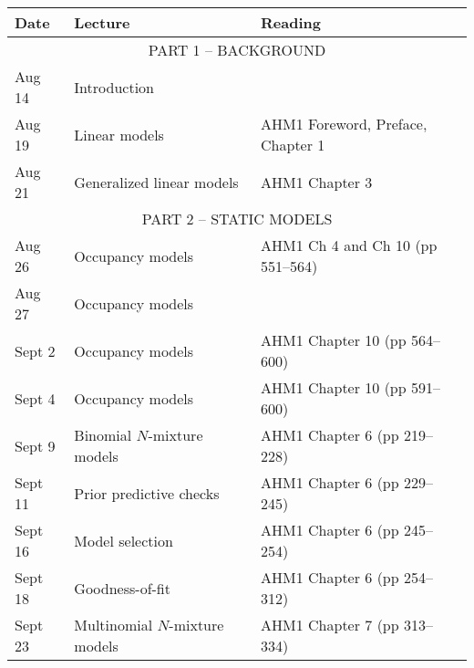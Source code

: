 \documentclass[12pt]{article}
\begin{document}
\begin{center}
\begin{tabular}[c]{lll}
\hline \hline
{\bf Date} & {\bf Lecture}                                & {\bf Reading}                                         \\
\hline
           \multicolumn{3}{c}{PART 1 -- BACKGROUND}                                                               \\
\hline
Aug 14     & Introduction                                 &                                                       \\
\hline
Aug 19     & Linear models                                & AHM1 Foreword, Preface, Chapter 1                     \\
Aug 21     & Generalized linear models                    & AHM1 Chapter 3                                        \\
\hline
           \multicolumn{3}{c}{PART 2 -- STATIC MODELS}                                                            \\
\hline
Aug 26     & Occupancy models                             & AHM1 Ch 4 and Ch 10 (pp 551--564)                     \\
Aug 27     & Occupancy models                             &                                                       \\
\hline
Sept 2     & Occupancy models                             & AHM1 Chapter 10 (pp 564--600)                         \\
Sept 4     & Occupancy models                             & AHM1 Chapter 10 (pp 591--600)                         \\
\hline
Sept 9    & Binomial $N$-mixture models                  & AHM1 Chapter 6 (pp 219--228)                          \\
Sept 11    & Prior predictive checks                      & AHM1 Chapter 6 (pp 229--245)                          \\
\hline
Sept 16    & Model selection                              & AHM1 Chapter 6 (pp 245--254)                          \\
Sept 18    & Goodness-of-fit                              & AHM1 Chapter 6 (pp 254--312)                          \\
\hline
Sept 23    & Multinomial $N$-mixture models               & AHM1 Chapter 7 (pp 313--334)                          \\

\end{tabular}
\end{center}
\end{document}
